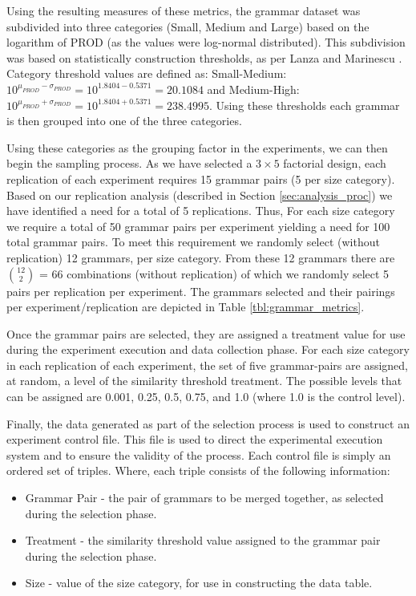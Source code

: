 \documentclass[10pt,nocc]{xrese_report}
\begin{document}
Using the resulting measures of these metrics, the grammar dataset was subdivided into three categories (Small, Medium and Large) based on the logarithm of PROD (as the values were log-normal distributed). This subdivision was based on statistically construction thresholds, as per Lanza and Marinescu \cite{lanza_object-oriented_2011}. Category threshold values are defined as: Small-Medium: \(10^{\mu_{PROD} - \sigma_{PROD}} = 10^{1.8404 - 0.5371} = 20.1084\) and Medium-High: \(10^{\mu_{PROD} + \sigma_{PROD}} = 10^{1.8404 + 0.5371} = 238.4995\). Using these thresholds each grammar is then grouped into one of the three categories.

Using these categories as the grouping factor in the experiments, we can then begin the sampling process. As we have selected a $3\times 5$ factorial design, each replication of each experiment requires 15 grammar pairs (5 per size category). Based on our replication analysis (described in Section \ref{sec:analysis_proc}) we have identified a need for a total of 5 replications. Thus, For each size category we require a total of 50 grammar pairs per experiment yielding a need for 100 total grammar pairs. To meet this requirement we randomly select (without replication) 12 grammars, per size category. From these 12 grammars there are $12 \choose 2$ = 66 combinations (without replication) of which we randomly select 5 pairs per replication per experiment. The grammars selected and their pairings per experiment/replication are depicted in Table \ref{tbl:grammar_metrics}.

Once the grammar pairs are selected, they are assigned a treatment value for use during the experiment execution and data collection phase. For each size category in each replication of each experiment, the set of five grammar-pairs are assigned, at random, a level of the similarity threshold treatment. The possible levels that can be assigned are 0.001, 0.25, 0.5, 0.75, and 1.0 (where 1.0 is the control level).

Finally, the data generated as part of the selection process is used to construct an experiment control file. This file is used to direct the experimental execution system and to ensure the validity of the process. Each control file is simply an ordered set of triples. Where, each triple consists of the following information:

\begin{itemize}
\item Grammar Pair - the pair of grammars to be merged together, as selected during the selection phase.
\item Treatment - the similarity threshold value assigned to the grammar pair during the selection phase.
\item Size - value of the size category, for use in constructing the data table.
\end{itemize}
\end{document}
